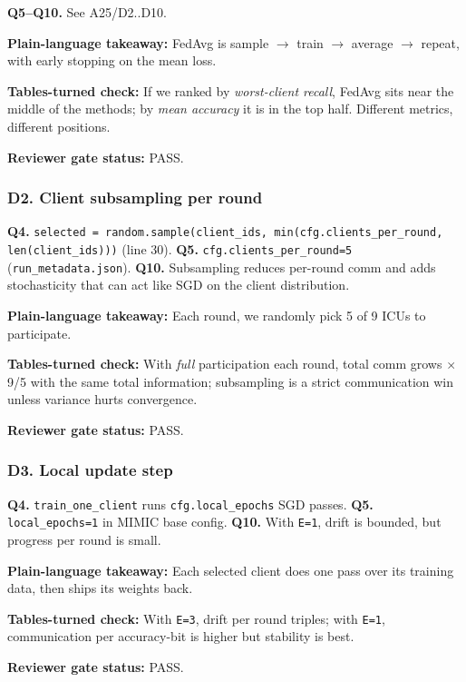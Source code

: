 \documentclass{article}
\begin{document}
\textbf{Q5--Q10.} See A25/D2..D10.


\textbf{Plain-language takeaway:} FedAvg is sample \ensuremath{\rightarrow} train \ensuremath{\rightarrow} average \ensuremath{\rightarrow} repeat, with early stopping on the mean loss.


\textbf{Tables-turned check:} If we ranked by \emph{worst-client recall}, FedAvg sits near the middle of the methods; by \emph{mean accuracy} it is in the top half. Different metrics, different positions.


\textbf{Reviewer gate status:} PASS.


\subsubsection{D2. Client subsampling per round}


\textbf{Q4.} \texttt{selected = random.sample(client\_ids, min(cfg.clients\_per\_round, len(client\_ids)))} (line 30). \textbf{Q5.} \texttt{cfg.clients\_per\_round=5} (\texttt{run\_metadata.json}). \textbf{Q10.} Subsampling reduces per-round comm and adds stochasticity that can act like SGD on the client distribution.


\textbf{Plain-language takeaway:} Each round, we randomly pick 5 of 9 ICUs to participate.


\textbf{Tables-turned check:} With \emph{full} participation each round, total comm grows \ensuremath{\times}9/5 with the same total information; subsampling is a strict communication win unless variance hurts convergence.


\textbf{Reviewer gate status:} PASS.


\subsubsection{D3. Local update step}


\textbf{Q4.} \texttt{train\_one\_client} runs \texttt{cfg.local\_epochs} SGD passes. \textbf{Q5.} \texttt{local\_epochs=1} in MIMIC base config. \textbf{Q10.} With \texttt{E=1}, drift is bounded, but progress per round is small.


\textbf{Plain-language takeaway:} Each selected client does one pass over its training data, then ships its weights back.


\textbf{Tables-turned check:} With \texttt{E=3}, drift per round triples; with \texttt{E=1}, communication per accuracy-bit is higher but stability is best.


\textbf{Reviewer gate status:} PASS.
\end{document}
